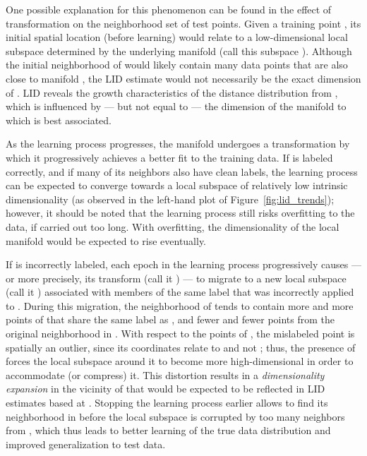 \documentclass{article}
\begin{document}
One possible explanation for this phenomenon can be found in the effect of transformation on the neighborhood set of test points.
Given a training point , its initial spatial location (before learning) would relate to a low-dimensional local subspace determined by the underlying manifold (call this subspace ). 
Although the initial neighborhood of  would likely contain many data points that are also close to manifold , the LID estimate would not
necessarily be the exact dimension of . LID reveals the growth characteristics of the distance distribution from , which is influenced by --- but not equal to --- the dimension of the manifold to which  is best associated.


As the learning process progresses, the manifold undergoes a transformation by which it progressively achieves a better fit to the training data. If  is labeled correctly, and if many of its neighbors also have clean labels, the learning process can be expected to converge towards a local subspace of relatively low intrinsic dimensionality (as observed in the left-hand plot of Figure~\ref{fig:lid_trends}); however, it should be noted that the learning process still risks overfitting to the data, if carried out too long. With overfitting, the dimensionality of the local manifold would be expected to rise eventually.

If  is incorrectly labeled, each epoch in the learning process progressively causes  --- or more precisely, its transform (call it ) --- to migrate to a new local subspace (call it ) associated with members of the same label that was incorrectly applied to . During this migration, the neighborhood of  tends to contain more and more points of  that share the same label as , and fewer and fewer points from the original neighborhood in . With respect to the points of , the mislabeled point  is spatially an outlier, since its coordinates relate to  and not ; thus, the presence of  forces the local subspace around it to become more high-dimensional in order to accommodate (or compress) it. This distortion results in a {\em dimensionality expansion} in the vicinity of  that would be expected to be reflected in LID estimates based at . Stopping the learning process earlier allows  to find its neighborhood in  before the local subspace is corrupted by too many neighbors from , which thus leads to better learning of the true data distribution and improved generalization to test data.
\end{document}
